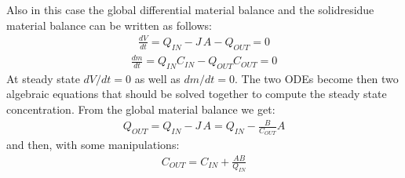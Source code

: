 \documentclass[letterpaper,10pt,english]{jupyterBook}
\begin{document}
\sphinxAtStartPar
Also in this case the global differential material balance and the solid\sphinxhyphen{}residue material balance can be written as follows:
\begin{equation}\label{equation:Process_layouts:PLYeq11}
\begin{split}
\frac{dV}{dt}=Q_{IN}-J\,A-Q_{OUT}=0
\end{split}
\end{equation}\begin{equation}\label{equation:Process_layouts:PLYeq12}
\begin{split}
\frac{dm}{dt}=Q_{IN}C_{IN}-Q_{OUT}C_{OUT}=0
\end{split}
\end{equation}
\sphinxAtStartPar
At steady state \({dV}/{dt}=0\) as well as \({dm}/{dt}=0\). The two ODEs become then two algebraic equations that should be solved together to compute the steady state concentration.
From the global material balance we get:
\begin{equation}\label{equation:Process_layouts:PLYeq13}
\begin{split}
Q_{OUT}=Q_{IN}-J\,A=Q_{IN}-\frac{B}{C_{OUT}}A
\end{split}
\end{equation}
\sphinxAtStartPar
and then, with some manipulations:
\begin{equation}\label{equation:Process_layouts:PLYeq14}
\begin{split}
C_{OUT}=C_{IN}+\frac{AB}{Q_{IN}}
\end{split}
\end{equation}
\end{document}
